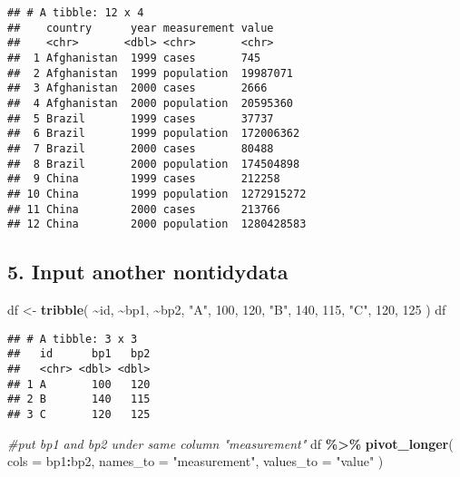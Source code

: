 \documentclass[
]{article}
\newenvironment{Shaded}{\begin{snugshade}}{\end{snugshade}}
\newcommand{\AttributeTok}[1]{\textcolor[rgb]{0.13,0.29,0.53}{#1}}
\newcommand{\CommentTok}[1]{\textcolor[rgb]{0.56,0.35,0.01}{\textit{#1}}}
\newcommand{\DecValTok}[1]{\textcolor[rgb]{0.00,0.00,0.81}{#1}}
\newcommand{\FunctionTok}[1]{\textcolor[rgb]{0.13,0.29,0.53}{\textbf{#1}}}
\newcommand{\NormalTok}[1]{#1}
\newcommand{\OtherTok}[1]{\textcolor[rgb]{0.56,0.35,0.01}{#1}}
\newcommand{\SpecialCharTok}[1]{\textcolor[rgb]{0.81,0.36,0.00}{\textbf{#1}}}
\newcommand{\StringTok}[1]{\textcolor[rgb]{0.31,0.60,0.02}{#1}}
\begin{document}
\begin{verbatim}
## # A tibble: 12 x 4
##    country      year measurement value     
##    <chr>       <dbl> <chr>       <chr>     
##  1 Afghanistan  1999 cases       745       
##  2 Afghanistan  1999 population  19987071  
##  3 Afghanistan  2000 cases       2666      
##  4 Afghanistan  2000 population  20595360  
##  5 Brazil       1999 cases       37737     
##  6 Brazil       1999 population  172006362 
##  7 Brazil       2000 cases       80488     
##  8 Brazil       2000 population  174504898 
##  9 China        1999 cases       212258    
## 10 China        1999 population  1272915272
## 11 China        2000 cases       213766    
## 12 China        2000 population  1280428583
\end{verbatim}

\hypertarget{input-another-nontidydata}{%
\subsection{5. Input another
nontidydata}\label{input-another-nontidydata}}

\begin{Shaded}
\begin{Highlighting}[]
\NormalTok{df }\OtherTok{\textless{}{-}} \FunctionTok{tribble}\NormalTok{(}
\SpecialCharTok{\textasciitilde{}}\NormalTok{id, }\SpecialCharTok{\textasciitilde{}}\NormalTok{bp1, }\SpecialCharTok{\textasciitilde{}}\NormalTok{bp2,}
\StringTok{"A"}\NormalTok{, }\DecValTok{100}\NormalTok{, }\DecValTok{120}\NormalTok{,}
\StringTok{"B"}\NormalTok{, }\DecValTok{140}\NormalTok{, }\DecValTok{115}\NormalTok{,}
\StringTok{"C"}\NormalTok{, }\DecValTok{120}\NormalTok{, }\DecValTok{125}
\NormalTok{)}
\NormalTok{df}
\end{Highlighting}
\end{Shaded}

\begin{verbatim}
## # A tibble: 3 x 3
##   id      bp1   bp2
##   <chr> <dbl> <dbl>
## 1 A       100   120
## 2 B       140   115
## 3 C       120   125
\end{verbatim}

\begin{Shaded}
\begin{Highlighting}[]
\CommentTok{\#put bp1 and bp2 under same column "measurement"}
\NormalTok{df }\SpecialCharTok{\%\textgreater{}\%}
\FunctionTok{pivot\_longer}\NormalTok{(}
\AttributeTok{cols =}\NormalTok{ bp1}\SpecialCharTok{:}\NormalTok{bp2,}
\AttributeTok{names\_to =} \StringTok{"measurement"}\NormalTok{,}
\AttributeTok{values\_to =} \StringTok{"value"}
\NormalTok{)}
\end{Highlighting}
\end{Shaded}
\end{document}
